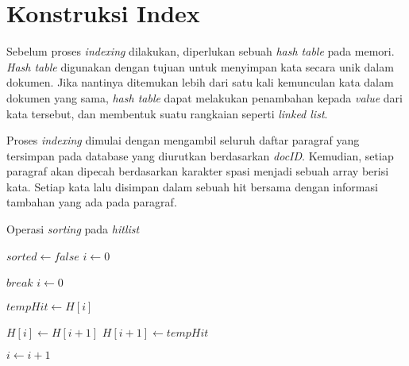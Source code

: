 \section{Konstruksi Index}

Sebelum proses \textit{indexing} dilakukan, diperlukan sebuah
\textit{hash table} pada memori. \textit{Hash table} digunakan dengan tujuan
untuk menyimpan kata secara unik dalam dokumen. Jika nantinya ditemukan lebih
dari satu kali kemunculan kata dalam dokumen yang sama, \textit{hash table}
dapat melakukan penambahan kepada \textit{value} dari kata tersebut, dan
membentuk suatu rangkaian seperti \textit{linked list}.

Proses \textit{indexing} dimulai dengan mengambil seluruh daftar paragraf yang
tersimpan pada database yang diurutkan berdasarkan \textit{docID}. Kemudian,
setiap paragraf akan dipecah berdasarkan karakter spasi menjadi sebuah array
berisi kata. Setiap kata lalu disimpan dalam sebuah hit bersama dengan informasi
tambahan yang ada pada paragraf.

\begin{algorithm}[H]
  \caption{Operasi \textit{sorting} pada \textit{hitlist}}\label{alg:insert}
  \begin{algorithmic}
      \State $sorted \gets false$
      \State $i \gets 0$

      \item[] %

        \Do
              \State $break$
            \Else
              \State $i \gets 0$
            \EndIf
          \EndIf

          \item[] %

          \State $tempHit \gets H[i]$

          \item[] %

            \State $H[i] \gets H[i+1]$
            \State $H[i+1] \gets tempHit$
          \EndIf

          \item[] %

          \State $i \gets i+1$

        \item[] %

      \State \Return
    \EndFunction
  \end{algorithmic}
\end{algorithm}

